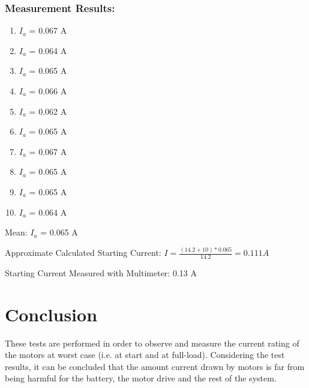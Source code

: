 \documentclass[10pt,a4paper]{article}
\begin{document}
\subsubsection{Measurement Results:}
\begin{enumerate}
\item $I_{a}$ = 0.067 A
\item $I_{a}$ = 0.064 A
\item $I_{a}$ = 0.065 A
\item $I_{a}$ = 0.066 A
\item $I_{a}$ = 0.062 A
\item $I_{a}$ = 0.065 A
\item $I_{a}$ = 0.067 A
\item $I_{a}$ = 0.065 A
\item $I_{a}$ = 0.065 A
\item $I_{a}$ = 0.064 A
\end{enumerate}
Mean: $I_{a}$ = 0.065 A
\vspace{0.5 cm}

Approximate Calculated Starting Current:
$I = \frac{(14.2+10)*0.065}{14.2} = 0.111 A$
\vspace{0.5 cm}
\par Starting Current Measured with Multimeter: 0.13 A

\section{Conclusion}
\hspace{0.5 cm}
These tests are performed in order to observe and measure the current rating of the motors at worst case (i.e. at start and at full-load). Considering the test results, it can be concluded that the amount current drawn by motors is far from being harmful for the battery, the motor drive and the rest of the system.
\end{document}
